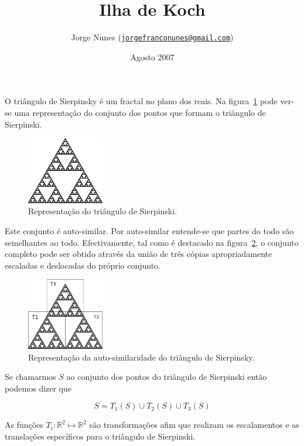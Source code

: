 \documentclass[11pt]{article}
\title{Ilha de Koch}
\author{Jorge Nunes ({\tt\href{mailto:jorgefranconunes@gmail.com}{jorgefranconunes@gmail.com}})}
\date{Agosto 2007}
\begin{document}
\maketitle

O triângulo de Sierpinsky é um fractal no plano dos reais. Na
figura~\ref{fig-triangulo} pode ver-se uma representação do conjunto
dos pontos que formam o triângulo de Sierpinski.

\begin{figure}[H]
  \centering
  \includegraphics[width=0.3\textwidth]{../images/xxx-007.png}
  \caption{Representação do triângulo de Sierpinski.}
  \label{fig-triangulo}
\end{figure}

Este conjunto é auto-similar. Por auto-similar entende-se que partes
do todo são semelhantes ao todo. Efectivamente, tal como é destacado
na figura~\ref{fig-sierpinski}, o conjunto completo pode ser obtido
através da união de três cópias apropriadamente escaladas e deslocadas
do próprio conjunto.

\begin{figure}[H]
  \centering
  \includegraphics[width=0.3\textwidth]{../images/sierpinski.png}
  \caption{Representação da auto-similaridade do triângulo de Sierpinsky.}
  \label{fig-sierpinski}
\end{figure}
 
Se chamarmos $S$ ao
conjunto dos pontos do triângulo de Sierpinski então podemos dizer que

\[
S = T_1(S) \cup T_2(S) \cup T_3(S)
\]

As funções $T_i : {\mathbb R}^2 \mapsto {\mathbb R}^2$ são
transformações afim que realizam os escalamentos e as translações
específicos para o triângulo de Sierpinski.
\end{document}
